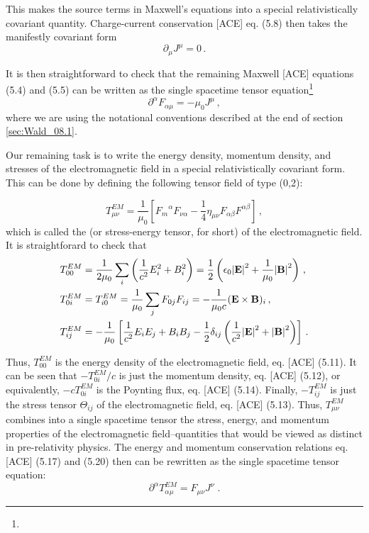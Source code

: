 This makes the source terms in Maxwell's equations into a special relativistically covariant quantity. 
Charge-current conservation [ACE] eq. (5.8) then takes the manifestly covariant form 
\begin{equation}\label{eq:Wald_08.48}
\partial_\mu J^\mu = 0 \,.
\end{equation}

It is then straightforward to check that the remaining Maxwell [ACE] equations (5.4) and (5.5) can be written as the single spacetime tensor equation\footnote{}
\begin{equation}\label{eq:Wald_08.49}
\partial^\alpha F_{\alpha \mu} = - \mu_0 J^\mu \,,
\end{equation}
where we are using the notational conventions described at the end of section \ref{sec:Wald_08.1}.

Our remaining task is to write the energy density, momentum density, and stresses of the electromagnetic field in a special relativistically covariant form. This can be done by defining the following tensor field of type (0,2):

\begin{equation}\label{eq:Wald_08.50}
T^{EM}_{\mu \nu} = \frac{1}{\mu_0} \left[{F_m}^\alpha F_{\nu \alpha} - \frac{1}{4} \eta_{\mu \nu} F_{\alpha \beta} F^{\alpha \beta} \right] \,,
\end{equation}
which is called the  (or stress-energy tensor, for short) of the electromagnetic field. It is straightforard to check that
\begin{align}
T^{EM}_{0 0} &= \frac{1}{2 \mu_0} \sum_i \left(\frac{1}{c^2} E_i^2 + B_i^2 \right) 
= \frac{1}{2} \left(\epsilon_0 \abs{\vb{E}}^2 + \frac{1}{\mu_0} \abs{\vb{B}}^2 \right) \,,\label{eq:Wald_08.51}\\
T^{EM}_{0 i} &= T^{EM}_{i 0} = \frac{1}{\mu_0} \sum_j F_{0 j} F_{i j} = - \frac{1}{\mu_0 c} (\vb{E} \times \vb{B})_i \,,\label{eq:Wald_08.52}\\
T^{EM}_{i j} &= - \frac{1}{\mu_0} \left[ \frac{1}{c^2} E_i  E_j + B_i B_j - \frac{1}{2} \delta_{i j} \left( \frac{1}{c^2}\abs{\vb{E}}^2 + \abs{\vb{B}}^2 \right)\right] \,.\label{eq:Wald_08.53}
\end{align}

Thus, $T^{EM}_{00}$ is the energy density of the electromagnetic field, eq. [ACE] (5.11). It can be seen that $-T^{EM}_{0i} / c$ is just the momentum density, eq. [ACE] (5.12), or equivalently,  $-c T^{EM}_{0i}$ is the Poynting flux,  eq. [ACE] (5.14). Finally, $- T^{EM}_{ij}$ is just the stress tensor $\Theta_{ij}$ of the electromagnetic field, eq. [ACE] (5.13). Thus, $T^{EM}_{\mu \nu}$ combines into a single spacetime tensor the stress, energy, and momentum properties of the electromagnetic field--quantities that would be viewed as distinct in pre-relativity physics. The energy and momentum conservation relations eq. [ACE] (5.17) and (5.20) then can be rewritten as the single spacetime tensor equation:
\begin{equation}\label{eq:Wald_08.54}
\partial^\alpha T^{EM}_{\alpha \mu} = F_{\mu \nu} J^\nu \;.
\end{equation}

